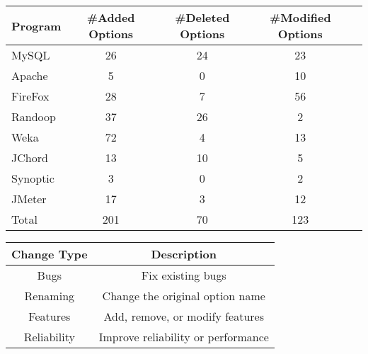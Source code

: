 \begin{table}[t]
\vspace{1mm}
\centering
\small{
\setlength{\tabcolsep}{.50\tabcolsep}
\begin{tabular}{|l||c|c|c|c|}
\hline
 Program & \#Added Options & \#Deleted Options& \#Modified Options\\
 \hline
 \hline
 MySQL& 26 & 24 & 23 \\
 Apache & 5 & 0 & 10 \\
 FireFox& 28 & 7 & 56 \\
 Randoop & 37  & 26 & 2\\
 Weka &  72 & 4 & 13 \\
 JChord & 13  & 10 & 5 \\
 Synoptic & 3 & 0 & 2 \\
 JMeter & 17  & 3 &  12 \\
\hline
\hline
 Total & 201 & 70 & 123 \\
\hline
\end{tabular}
}
\vspace{-2mm}
\end{table}


\begin{table}[t]
\vspace{1mm}
\centering
\small{
\setlength{\tabcolsep}{.50\tabcolsep}
\begin{tabular}{|c|c|}
\hline
 \textbf{Change Type} & \textbf{Description} \\
 \hline
 \hline
Bugs & Fix existing bugs\\
 \hline
Renaming & Change the original option name\\
 \hline
Features & Add, remove, or modify features\\
 \hline
Reliability & Improve reliability or performance\\
\hline
\end{tabular}
}
\vspace{-2mm}
\end{table}

